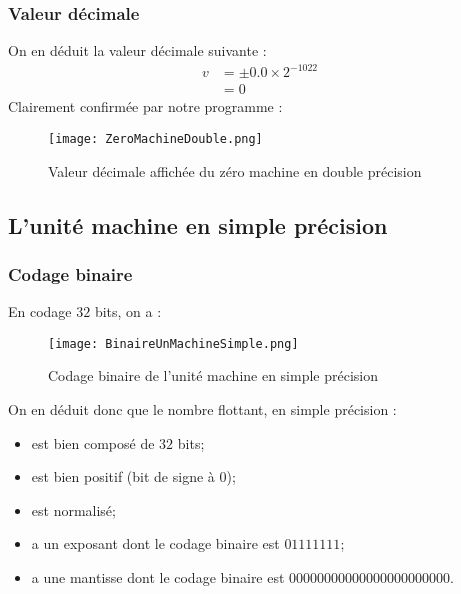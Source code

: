\documentclass[a4paper, titlepage]{livret} %
\begin{document}
				\subsubsection{Valeur décimale}
					On en déduit la valeur décimale suivante :
					\[\begin{aligned}
						v & = \pm 0.0 \times 2^{-1022}\\
						  & = 0
					\end{aligned}\]
					Clairement confirmée par notre programme :
					\begin{figure}[!h]
						\centering
  							\texttt{[image: ZeroMachineDouble.png]}
  							\caption{Valeur décimale affichée du zéro machine en double précision}
					\end{figure}
			    	
			\subsection{L'unité machine en simple précision}
				\subsubsection{Codage binaire}
					En codage $32$ bits, on a :
					\begin{figure}[!h]
						\centering
  							\texttt{[image: BinaireUnMachineSimple.png]}
  							\caption{Codage binaire de l'unité machine en simple précision}
					\end{figure}

					On en déduit donc que le nombre flottant, en simple précision :
					\begin{itemize}
						\item est bien composé de $32$ bits;
						\item est bien positif (bit de signe à 0);
						\item est normalisé;
						\item a un exposant dont le codage binaire est $01111111$;
						\item a une mantisse dont le codage binaire est $00000000 00000000 0000000$.
					\end{itemize}
\end{document}
